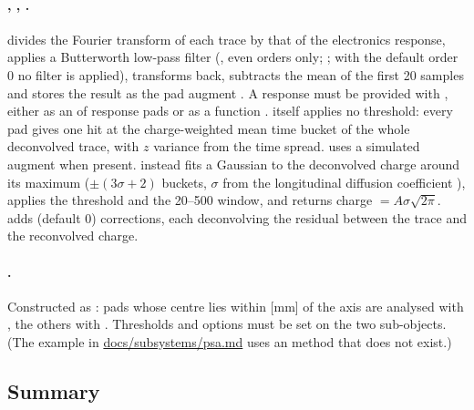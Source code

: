 \paragraph{, , .}
 divides the Fourier transform of each trace by that of the electronics
response, applies a Butterworth low-pass filter (, even orders only;
; with the default order 0 no filter is applied), transforms back, subtracts
the mean of the first 20 samples and stores the result as the pad augment . A response
must be provided with , either as an  of response pads or as a
function .  itself applies no threshold: every pad gives
one hit at the charge-weighted mean time bucket of the whole deconvolved trace, with $z$ variance
from the time spread.  uses a simulated  augment when present.
 instead fits a Gaussian to the deconvolved charge around its maximum
($\pm(3\sigma+2)$ buckets, $\sigma$ from the longitudinal diffusion coefficient ),
applies the threshold and the 20--500 window, and returns charge $= A\sigma\sqrt{2\pi}$.
 adds  (default 0) corrections, each deconvolving the
residual between the trace and the reconvolved charge.

\paragraph{.} Constructed as : pads whose centre lies within  [mm] of the axis are analysed with
, the others with . Thresholds and options must be set on the two
sub-objects. (The example in \url{docs/subsystems/psa.md} uses an  method that does
not exist.)

\subsection{Summary}

